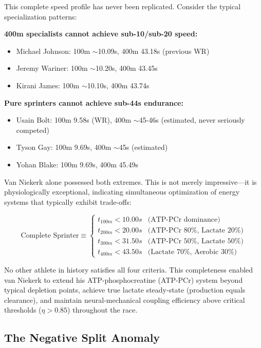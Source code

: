 \documentclass[twocolumn,10pt]{article}
\begin{document}
This complete speed profile has never been replicated. Consider the typical specialization patterns:

\textbf{400m specialists cannot achieve sub-10/sub-20 speed:}
\begin{itemize}
    \item Michael Johnson: 100m $\sim$10.09s, 400m 43.18s (previous WR)
    \item Jeremy Wariner: 100m $\sim$10.20s, 400m 43.45s
    \item Kirani James: 100m $\sim$10.10s, 400m 43.74s
\end{itemize}

\textbf{Pure sprinters cannot achieve sub-44s endurance:}
\begin{itemize}
    \item Usain Bolt: 100m 9.58s (WR), 400m $\sim$45-46s (estimated, never seriously competed)
    \item Tyson Gay: 100m 9.69s, 400m $\sim$45s (estimated)
    \item Yohan Blake: 100m 9.69s, 400m 45.49s
\end{itemize}

Van Niekerk alone possessed both extremes. This is not merely impressive—it is physiologically exceptional, indicating simultaneous optimization of energy systems that typically exhibit trade-offs:

\begin{equation}
\text{Complete Sprinter} \equiv \begin{cases}
t_{100m} < 10.00s & \text{(ATP-PCr dominance)} \\
t_{200m} < 20.00s & \text{(ATP-PCr 80\%, Lactate 20\%)} \\
t_{300m} < 31.50s & \text{(ATP-PCr 50\%, Lactate 50\%)} \\
t_{400m} < 43.50s & \text{(Lactate 70\%, Aerobic 30\%)}
\end{cases}
\end{equation}

No other athlete in history satisfies all four criteria. This completeness enabled van Niekerk to extend his ATP-phosphocreatine (ATP-PCr) system beyond typical depletion points, achieve true lactate steady-state (production equals clearance), and maintain neural-mechanical coupling efficiency above critical thresholds ($\eta > 0.85$) throughout the race.

\subsection{The Negative Split Anomaly}
\end{document}
